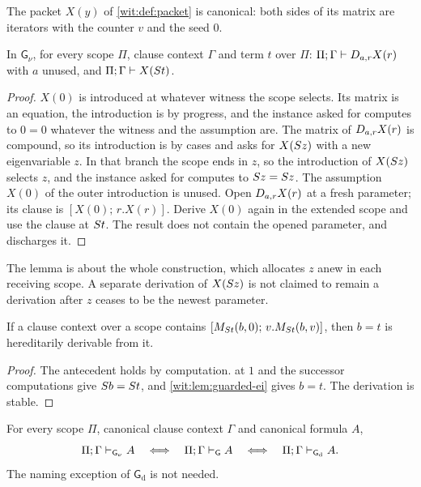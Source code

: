 The packet $X(y)$ of \cref{wit:def:packet} is canonical: both sides of its
matrix are iterators with the counter $v$ and the seed $0$.

\begin{lemma}
\label{wit:lem:guarded-packet}
In $\mathsf{G}_{\nu}$, for every scope $\Pi$, clause context $\Gamma$ and
term $t$ over $\Pi$: $\Pi;\Gamma\vdash D_{a,r}X(r)$ with $a$ unused, and
$\Pi;\Gamma\vdash X(S t)$.
\end{lemma}

\begin{proof}
$X(0)$ is introduced at whatever witness the scope selects.  Its matrix is
an equation, the introduction is by progress, and the instance asked for
computes to $0=0$ whatever the witness and the assumption are.  The matrix
of $D_{a,r}X(r)$ is compound, so its introduction is by cases and asks for
$X(S z)$ with a new eigenvariable $z$.  In that branch the scope ends in
$z$, so the introduction of $X(S z)$ selects $z$, and the instance asked
for computes to $S z=S z$.  The assumption $X(0)$ of the outer
introduction is unused.  Open $D_{a,r}X(r)$ at a fresh parameter; its
clause is $[X(0);\,r.X(r)]$.  Derive $X(0)$ again in the extended scope and
use the clause at $S t$.  The result does not contain the opened
parameter, and  discharges it.
\end{proof}

The lemma is about the whole construction, which allocates $z$ anew in each
receiving scope.  A separate derivation of $X(S z)$ is not claimed to
remain a derivation after $z$ ceases to be the newest parameter.

\begin{lemma}
\label{wit:lem:guarded-alias}
If a clause context over a scope contains
$[M_{S t}(b,0);\,v.M_{S t}(b,v)]$, then $b=t$ is hereditarily
derivable from it.
\end{lemma}

\begin{proof}
The antecedent holds by computation.   at $1$ and the
successor computations give $S b=S t$, and
\cref{wit:lem:guarded-ei} gives $b=t$.  The derivation is stable.
\end{proof}

\begin{theorem}
\label{wit:thm:guarded-uniform}
For every scope $\Pi$, canonical clause context $\Gamma$ and canonical
formula $A$,
\[
 \Pi;\Gamma\vdash_{\mathsf{G}_{\nu}}A
 \quad\Longleftrightarrow\quad
 \Pi;\Gamma\vdash_{\mathsf{G}}A
 \quad\Longleftrightarrow\quad
 \Pi;\Gamma\vdash_{\mathsf{G}_{\mathrm d}}A .
\]
The naming exception of $\mathsf{G}_{\mathrm d}$ is not needed.
\end{theorem}

